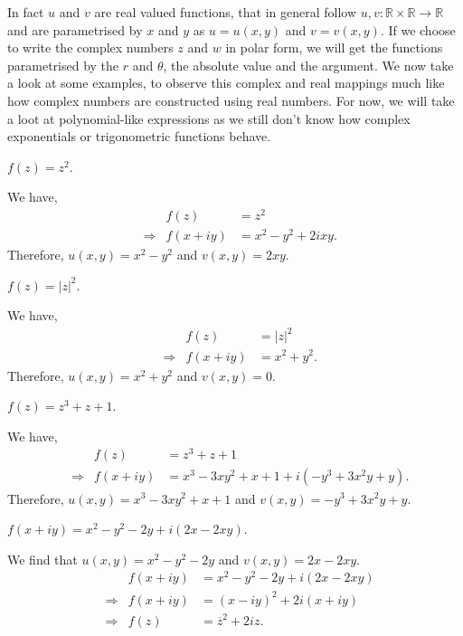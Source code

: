 \documentclass[12pt]{book}
\begin{document}
In fact $u$ and $v$ are real valued functions, that in general follow $u, v: \mathbb{R} \times \mathbb{R} \rightarrow \mathbb{R}$ and are parametrised by $x$ and $y$ as $u = u(x, y)$ and $v = v(x, y)$. If we choose to write the complex numbers $z$ and $w$ in polar form, we will get the functions parametrised by the $r$ and $\theta$, the absolute value and the argument. We now take a look at some examples, to observe this complex and real mappings much like how complex numbers are constructed using real numbers. For now, we will take a loot at polynomial-like expressions as we still don't know how complex exponentials or trigonometric functions behave.

\begin{exmp}
    $f(z) = z^2.$
\end{exmp}
We have,
\begin{align*}
    &&f(z) 
        &= z^2 \\
    &\Rightarrow &f(x + iy) 
        &= x^2 - y^2 + 2ixy .
\end{align*}
Therefore, $u(x, y) = x^2 - y^2$ and $v(x, y) = 2xy.$

\begin{exmp}
    $f(z) = |z|^2.$
\end{exmp}
We have,
\begin{align*}
    &&f(z) 
        &= |z|^2 \\
    &\Rightarrow &f(x + iy) 
        &=  x^2 + y^2.
\end{align*}
Therefore, $u(x, y) = x^2 + y^2$ and $v(x, y) = 0.$

\begin{exmp}
    $f(z) = z^3 + z + 1.$
\end{exmp}
We have,
\begin{align*}
    &&f(z) 
        &= z^3 + z + 1\\
    &\Rightarrow &f(x + iy) 
        &= x^3 - 3xy^2 + x + 1 + i(-y^3 + 3x^2y + y).
\end{align*}
Therefore, $u(x, y) = x^3 - 3xy^2 + x + 1$ and $v(x, y) = -y^3 + 3x^2y + y.$

\begin{exmp}
    $f(x + iy) = x^2 - y^2 - 2y + i(2x - 2xy).$
\end{exmp}
We find that $u(x, y) = x^2 - y^2 - 2y$ and $v(x, y) = 2x - 2xy.$
\begin{align*}
    &&f(x + iy) 
        &= x^2 - y^2 - 2y + i(2x - 2xy)\\
    &\Rightarrow &f(x + iy) 
        &= (x - iy)^2 + 2i(x + iy) \\
    &\Rightarrow &f(z)
        &= \overline{z}^{2} + 2iz.
\end{align*}
\end{document}
